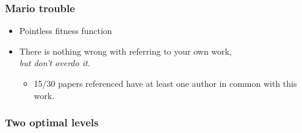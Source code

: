 \documentclass{beamer}
\begin{document}
\begin{frame}
\frametitle{Mario trouble}
\begin{itemize}
\item Pointless fitness function
\item There is nothing wrong with referring to your own work, \\\textit{but don't overdo it}.
\begin{itemize}
\item 15/30 papers referenced have at least one author in common with this work.
\end{itemize}
\end{itemize}
\end{frame}

\begin{frame}
\frametitle{Two optimal levels}

\end{frame}
\end{document}
